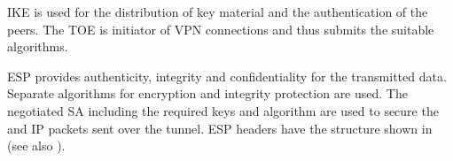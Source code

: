 
IKE is used for the distribution of key material and the authentication of the
peers. The TOE is initiator of VPN connections and thus submits the suitable algorithms.



ESP provides authenticity, integrity and confidentiality for the transmitted
data. Separate algorithms for encryption and integrity protection are used. The
negotiated SA including the required keys and algorithm are used to secure the
and IP packets sent over the tunnel. ESP headers have the structure shown in
 (see also
\cite[Figure~2]{rfc4303}).


